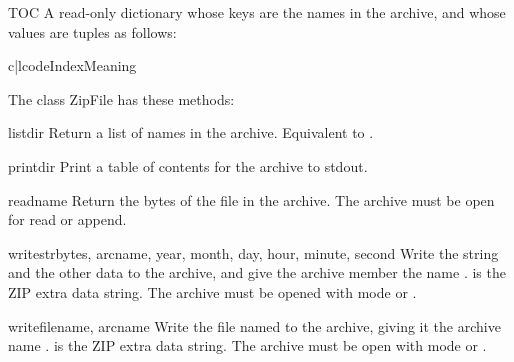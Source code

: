 \begin{memberdesc}{TOC}
  A read-only dictionary whose keys are the names in the archive, and
  whose values are tuples as follows:

\begin{tableii}{c|l}{code}{Index}{Meaning}
\end{tableii}
\end{memberdesc}

The class ZipFile has these methods: 

\begin{methoddesc}{listdir}{}
  Return a list of names in the archive.  Equivalent to
  .
\end{methoddesc}

\begin{methoddesc}{printdir}{}
  Print a table of contents for the archive to stdout. 
\end{methoddesc}

\begin{methoddesc}{read}{name}
  Return the bytes of the file in the archive.  The archive must be
  open for read or append.
\end{methoddesc}

\begin{methoddesc}{writestr}{bytes, arcname, year, month, day, hour,
                             minute, second}
  Write the string  and the other data to the archive, and
  give the archive member the name .   is the
  ZIP extra data string.  The archive must be opened with mode
   or .
\end{methoddesc}

\begin{methoddesc}{write}{filename, arcname}
  Write the file named  to the archive, giving it the
  archive name .   is the ZIP extra data
  string.  The archive must be open with mode  or
  .
\end{methoddesc}

